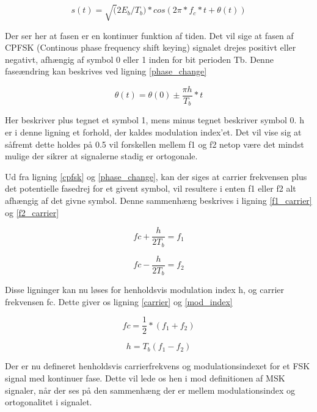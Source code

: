 \begin{appendices}
\begin{equation} \label{cpfsk}
s(t) = \sqrt(2E_b / T_b) * cos(2 \pi * f_c * t + \theta(t))
\end{equation}

Der ser her at fasen er en kontinuer funktion af tiden. Det vil sige at fasen af CPFSK (Continous phase frequency shift keying) signalet drejes positivt eller negativt, afhængig af symbol 0 eller 1 inden for bit perioden Tb. Denne faseændring kan beskrives ved ligning \ref{phase_change}

\begin{equation} \label{phase_change}
\theta(t) = \theta(0) \pm \frac{\pi h}{T_b} * t
\end{equation}

Her beskriver plus tegnet et symbol 1, mens minus tegnet beskriver symbol 0. h er i denne ligning et forhold, der kaldes modulation index'et. Det vil vise sig at såfremt dette holdes på 0.5 vil forskellen mellem f1 og f2 netop være det mindst mulige der sikrer at signalerne stadig er ortogonale. 

Ud fra ligning \ref{cpfsk} og \ref{phase_change}, kan der siges at carrier frekvensen plus det potentielle fasedrej for et givent symbol, vil resultere i enten f1 eller f2 alt afhængig af det givne symbol. Denne sammenhæng beskrives i ligning \ref{f1_carrier} og \ref{f2_carrier}

\begin{equation} \label{f1_carrier}
fc + \frac{h}{2T_b} = f_1
\end{equation}

\begin{equation} \label{f2_carrier}
fc - \frac{h}{2T_b} = f_2
\end{equation}

Disse ligninger kan nu løses for henholdsvis modulation index h, og carrier frekvensen fc. Dette giver os ligning \ref{carrier} og \ref{mod_index}

\begin{equation} \label{carrier}
fc = \frac{1}{2} * (f_1 + f_2)
\end{equation}

\begin{equation} \label{mod_index}
h = T_b(f_1-f_2)
\end{equation}

Der er nu defineret henholdsvis carrierfrekvens og modulationsindexet for et FSK signal med kontinuer fase. Dette vil lede os hen i mod definitionen af MSK signaler, når der ses på den sammenhæng der er mellem modulationsindex og ortogonalitet i signalet.


\end{appendices}
